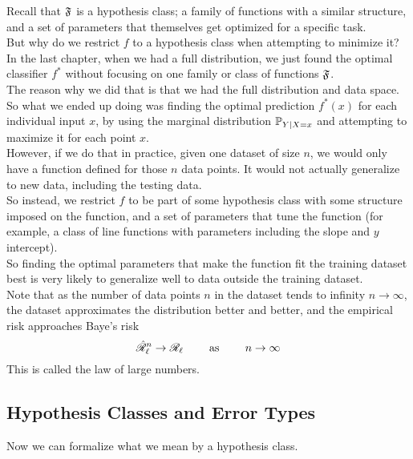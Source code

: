 \documentclass[12pt]{article}
\begin{document}
Recall that $\mathfrak{F}$ is a hypothesis class;
a family of functions with a similar structure,
and a set of parameters that themselves
get optimized for a specific task. \\

But why do we restrict $f$
to a hypothesis class when attempting
to minimize it? \\

In the last chapter, when we had a full distribution,
we just found the optimal classifier $f^*$
without focusing on one family or class
of functions $\mathfrak{F}$. \\
The reason why we did that is that we had the
full distribution and data space.
So what we ended up doing was finding the
optimal prediction $f^*(x)$
for each individual input $x$,
by using the marginal distribution 
$\mathbb{P}_{Y \mid X = x}$ and attempting to maximize
it for each point $x$. \\

However, if we do that in practice,
given one dataset of size $n$,
we would only have a function defined
for those $n$ data points.
It would not actually generalize to new
data, including the testing data. \\

So instead, we restrict $f$
to be part of some hypothesis class
with some structure imposed on the function,
and a set of parameters that tune the
function (for example, a class of line functions
with parameters including the slope 
and $y$ intercept). \\
So finding the optimal parameters that make
the function fit the training dataset best
is very likely to generalize well
to data outside the training dataset. \\

Note that as the number of data points $n$
in the dataset tends to infinity $n \to \infty$,
the dataset approximates the distribution
better and better,
and the empirical risk approaches Baye's risk
\[ \hat{\mathscr{R}}_\ell^n \to \mathscr{R}_\ell  
\qquad \text{ as } \qquad n \to \infty \]
This is called the law of large numbers. \\

\newpage

\subsection*{Hypothesis Classes and Error Types}

Now we can formalize what we mean
by a hypothesis class. \\
\end{document}

